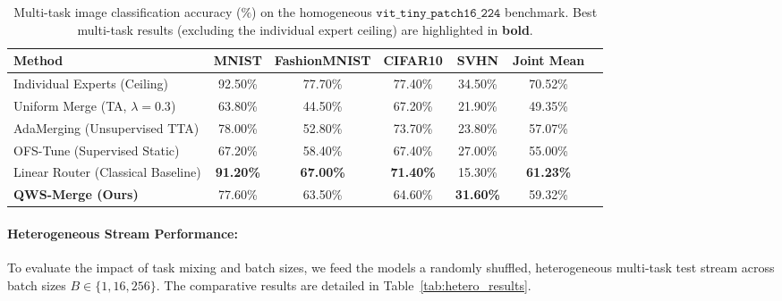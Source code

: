 \begin{table}[t]
\caption{Multi-task image classification accuracy ($\%$) on the homogeneous $\mathtt{vit\_tiny\_patch16\_224}$ benchmark. Best multi-task results (excluding the individual expert ceiling) are highlighted in \textbf{bold}.}
\label{tab:main_results}
\vskip 0.15in
\begin{center}
\begin{small}
\begin{sc}
\begin{tabular}{lcccccr}
\toprule
Method & MNIST & FashionMNIST & CIFAR10 & SVHN & Joint Mean \\
\midrule
Individual Experts (Ceiling)   & 92.50\% & 77.70\% & 77.40\% & 34.50\% & 70.52\% \\
\midrule
Uniform Merge (TA, $\lambda = 0.3$) & 63.80\%  & 44.50\%  & 67.20\% & 21.90\% & 49.35\% \\
AdaMerging (Unsupervised TTA) & 78.00\% & 52.80\%  & 73.70\% & 23.80\% & 57.07\%  \\
OFS-Tune (Supervised Static)  & 67.20\%  & 58.40\% & 67.40\% & 27.00\% & 55.00\% \\
Linear Router (Classical Baseline) & \textbf{91.20\%} & \textbf{67.00\%} & \textbf{71.40\%} & 15.30\% & \textbf{61.23\%} \\
\midrule
\textbf{QWS-Merge (Ours)}      & 77.60\% & 63.50\% & 64.60\% & \textbf{31.60\%} & 59.32\% \\
\bottomrule
\end{tabular}
\end{sc}
\end{small}
\end{center}
\vskip -0.1in
\end{table}

\paragraph{Heterogeneous Stream Performance:}
To evaluate the impact of task mixing and batch sizes, we feed the models a randomly shuffled, heterogeneous multi-task test stream across batch sizes $B \in \{1, 16, 256\}$. The comparative results are detailed in Table~\ref{tab:hetero_results}.

